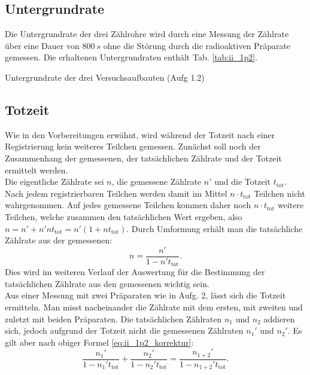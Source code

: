 \subsection{Untergrundrate}
Die Untergrundrate der drei Zählrohre wird durch eine Messung der Zählrate über eine Dauer von $\SI{800}{s}$ ohne die Störung durch die radioaktiven Präparate gemessen. Die erhaltenen Untergrundraten enthält Tab. \ref{tab:ii_1p2}.

\begin{table}[tb]
	\centering
	\caption{Untergrundrate der drei Versuchsaufbauten (Aufg 1.2)}
	\label{tab:ii_1p2}
	
\end{table}

\subsection{Totzeit}
Wie in den Vorbereitungen erwähnt, wird während der Totzeit nach einer Registrierung kein weiteres Teilchen gemessen. Zunächst soll noch der Zusammenhang der gemessenen, der tatsächlichen Zählrate und der Totzeit ermittelt werden.\\
Die eigentliche Zählrate sei $n$, die gemessene Zählrate $n'$ und die Totzeit $t_\mathrm{tot}$. Nach jedem registrierbaren Teilchen werden damit im Mittel $n \cdot t_\mathrm{tot}$ Teilchen nicht wahrgenommen. Auf jedes gemessene Teilchen kommen daher noch $n \cdot t_\mathrm{tot}$ weitere Teilchen, welche zusammen den tatsächlichen Wert ergeben, also $n = n' + n'nt_\mathrm{tot} = n'(1+nt_\mathrm{tot})$. Durch Umformung erhält man die tatsächliche Zählrate aus der gemessenen:
\begin{equation}
n = \frac{n'}{1-n't_\mathrm{tot}}. \label{eq:ii_1p2_korrektur}
\end{equation}
Dies wird im weiteren Verlauf der Auswertung für die Bestimmung der tatsächlichen Zählrate aus den gemessenen wichtig sein.\\
Aus einer Messung mit zwei Präparaten wie in Aufg. 2, lässt sich die Totzeit ermitteln. Man misst nacheinander die Zählrate mit dem ersten, mit zweiten und zuletzt mit beiden Präparaten. Die tatsächlichen Zählraten $n_1$ und $n_2$ addieren sich, jedoch aufgrund der Totzeit nicht die gemessenen Zählraten $n_1'$ und $n_2'$. Es gilt aber nach obiger Formel \eqref{eq:ii_1p2_korrektur}:
\begin{equation}
\frac{n_1'}{1-n_1't_\mathrm{tot}} + \frac{n_2'}{1-n_2't_\mathrm{tot}} = \frac{n_{1+2}'}{1-n_{1+2}'t_\mathrm{tot}}.
\end{equation}
